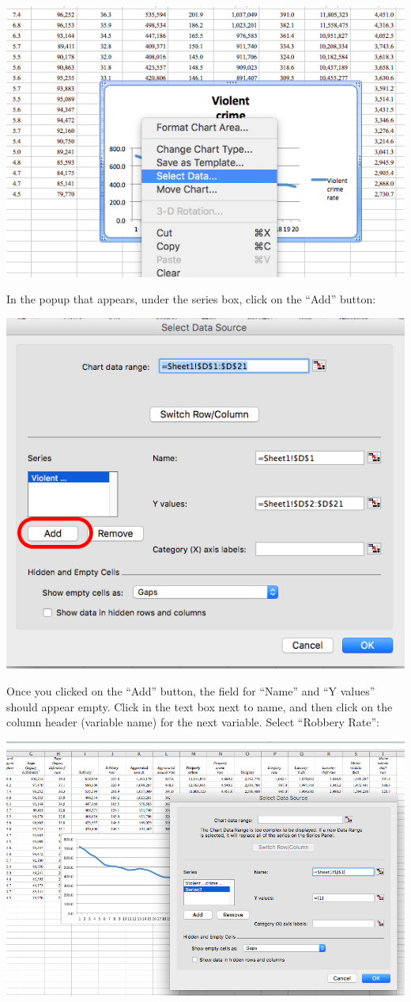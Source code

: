 \documentclass[
]{book}
\begin{document}
\includegraphics{imgs/comp_c_1.png}

In the popup that appears, under the series box, click on the ``Add'' button:

\includegraphics{imgs/comp_c_2.png}

Once you clicked on the ``Add'' button, the field for ``Name'' and ``Y values'' should appear empty. Click in the text box next to name, and then click on the column header (variable name) for the next variable. Select ``Robbery Rate'':

\includegraphics{imgs/comp_c_3.png}
\end{document}

